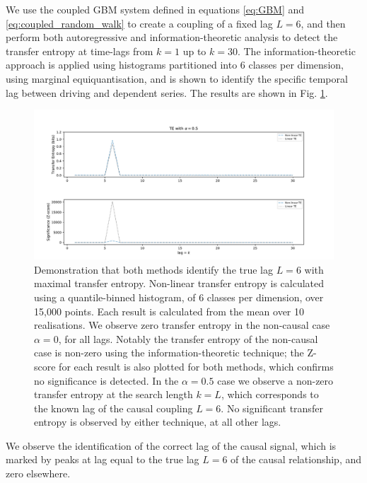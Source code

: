 \documentclass[]{rsos}%
\begin{document}
{  We use the coupled GBM system defined in equations \ref{eq:GBM} and \ref{eq:coupled_random_walk} to create a coupling of a fixed lag $L=6$, and then perform both autoregressive and information-theoretic analysis to detect the transfer entropy at time-lags from $k=1$ up to $k=30$. The information-theoretic approach is applied using histograms partitioned into 6 classes per dimension, using marginal equiquantisation, and is shown to identify the specific temporal lag between driving and dependent series. The results are shown in Fig. \ref{fig:dropoff}.

  \begin{figure}[!htb]
    \includegraphics[width=\linewidth]{images/dropoff3.pdf}
    \caption{ Demonstration that both methods identify the true lag $L=6$  with maximal transfer entropy. Non-linear transfer entropy is calculated using a quantile-binned histogram, of 6 classes per dimension, over 15,000 points. Each result is calculated from the mean over 10 realisations. We observe zero transfer entropy in the non-causal case $\alpha = 0$, for all lags. Notably the transfer entropy of the non-causal case is non-zero using the information-theoretic technique; the Z-score for each result is also plotted for both methods, which confirms no significance is detected. In the $\alpha = 0.5$ case we observe a non-zero transfer entropy at the search length $k = L$, which corresponds to the known lag of the causal coupling $L=6$. No significant transfer entropy is observed by either technique, at all other lags. 
    }
    \label{fig:dropoff}
    
  \end{figure}
  
  We observe the identification of the correct lag of the causal signal, which is marked by peaks at lag equal to the true lag $L=6$ of the causal relationship, and zero elsewhere. 



}
\end{document}
